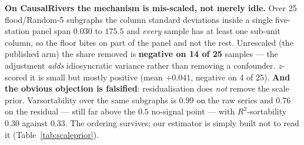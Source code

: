 \begin{table}[t]
\vspace{3pt}
{\footnotesize\raggedright
\textbf{On CausalRivers the mechanism is mis-scaled, not merely idle.} Over 25
flood/Random-5 subgraphs the column standard deviations inside a single five-station
panel span $0.030$ to $175.5$ and \emph{every} sample has at least one
sub-unit column, so the floor bites on part of the panel and not the rest. Unrescaled
(the published arm) the share removed is \textbf{negative on 14 of 25} samples
--- the adjustment \emph{adds} idiosyncratic variance rather than removing a confounder.
$z$-scored it is small but mostly positive (mean $+0.041$, negative on 4 of
25). \textbf{And the obvious objection is falsified}: residualisation does \emph{not}
remove the scale prior. Varsortability over the same subgraphs is $0.99$ on the raw
series and $0.76$ on the \cafe{} residual --- still far above the $0.5$ no-signal
point --- with $R^2$-sortability $0.30$ against $0.33$. The ordering survives;
our estimator is simply built not to read it (Table~\ref{tab:scaleprior}).\par}
\end{table}

